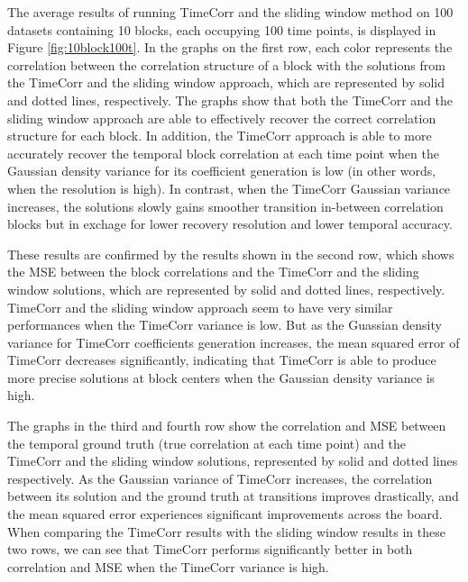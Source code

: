 \documentclass[11pt]{article}
\begin{document}
The average results of running TimeCorr and the sliding window method on 100 datasets containing 10 blocks, each occupying 100 time points, is displayed in Figure \ref{fig:10block100t}. In the graphs on the first row, each color represents the correlation between the correlation structure of a block with the solutions from the TimeCorr and the sliding window approach, which are represented by solid and dotted lines, respectively. The graphs show that both the TimeCorr and the sliding window approach are able to effectively recover the correct correlation structure for each block. In addition, the TimeCorr approach is able to more accurately recover the temporal block correlation at each time point when the Gaussian density variance for its coefficient generation is low (in other words, when the resolution is high). In contrast, when the TimeCorr Gaussian variance increases, the solutions slowly gains smoother transition in-between correlation blocks but in exchage for lower recovery resolution and lower temporal accuracy.

These results are confirmed by the results shown in the second row, which shows the MSE between the block correlations and the TimeCorr and the sliding window solutions, which are represented by solid and dotted lines, respectively. TimeCorr and the sliding window approach seem to have very similar performances when the TimeCorr variance is low. But as the Guassian density variance for TimeCorr coefficients generation increases, the mean squared error of TimeCorr decreases significantly, indicating that TimeCorr is able to produce more precise solutions at block centers when the Gaussian density variance is high.

The graphs in the third and fourth row show the correlation and MSE between the temporal ground truth (true correlation at each time point) and the TimeCorr and the sliding window solutions, represented by solid and dotted lines respectively. As the Gaussian variance of TimeCorr increases, the correlation between its solution and the ground truth at transitions improves drastically, and the mean squared error experiences significant improvements across the board. When comparing the TimeCorr results with the sliding window results in these two rows, we can see that TimeCorr performs significantly better in both correlation and MSE when the TimeCorr variance is high.
\end{document}
